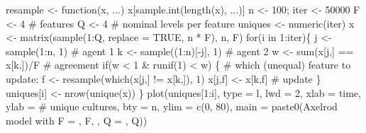 \documentclass[
  a4paper,
  DIV=11,
  numbers=noendperiod,
  oneside]{scrreprt}
\newenvironment{Shaded}{}{}
\newcommand{\AttributeTok}[1]{\textcolor[rgb]{0.84,0.23,0.29}{#1}}
\newcommand{\CommentTok}[1]{\textcolor[rgb]{0.42,0.45,0.49}{#1}}
\newcommand{\ConstantTok}[1]{\textcolor[rgb]{0.00,0.36,0.77}{#1}}
\newcommand{\ControlFlowTok}[1]{\textcolor[rgb]{0.84,0.23,0.29}{#1}}
\newcommand{\DecValTok}[1]{\textcolor[rgb]{0.00,0.36,0.77}{#1}}
\newcommand{\FunctionTok}[1]{\textcolor[rgb]{0.44,0.26,0.76}{#1}}
\newcommand{\NormalTok}[1]{\textcolor[rgb]{0.14,0.16,0.18}{#1}}
\newcommand{\OtherTok}[1]{\textcolor[rgb]{0.44,0.26,0.76}{#1}}
\newcommand{\SpecialCharTok}[1]{\textcolor[rgb]{0.00,0.36,0.77}{#1}}
\newcommand{\StringTok}[1]{\textcolor[rgb]{0.01,0.18,0.38}{#1}}
\begin{document}
\begin{Shaded}
\begin{Highlighting}[]
\NormalTok{resample }\OtherTok{\textless{}{-}} \ControlFlowTok{function}\NormalTok{(x, ...) x[}\FunctionTok{sample.int}\NormalTok{(}\FunctionTok{length}\NormalTok{(x), ...)]}
\NormalTok{n }\OtherTok{\textless{}{-}} \DecValTok{100}\NormalTok{; iter }\OtherTok{\textless{}{-}} \DecValTok{50000}
\NormalTok{F }\OtherTok{\textless{}{-}} \DecValTok{4} \CommentTok{\# features}
\NormalTok{Q }\OtherTok{\textless{}{-}} \DecValTok{4} \CommentTok{\# nominal levels per feature}
\NormalTok{uniques }\OtherTok{\textless{}{-}} \FunctionTok{numeric}\NormalTok{(iter)}
\NormalTok{x }\OtherTok{\textless{}{-}} \FunctionTok{matrix}\NormalTok{(}\FunctionTok{sample}\NormalTok{(}\DecValTok{1}\SpecialCharTok{:}\NormalTok{Q, }\AttributeTok{replace =} \ConstantTok{TRUE}\NormalTok{, n }\SpecialCharTok{*}\NormalTok{ F), n, F)}
\ControlFlowTok{for}\NormalTok{(i }\ControlFlowTok{in} \DecValTok{1}\SpecialCharTok{:}\NormalTok{iter)\{}
\NormalTok{  j }\OtherTok{\textless{}{-}} \FunctionTok{sample}\NormalTok{(}\DecValTok{1}\SpecialCharTok{:}\NormalTok{n, }\DecValTok{1}\NormalTok{)       }\CommentTok{\# agent 1}
\NormalTok{  k }\OtherTok{\textless{}{-}} \FunctionTok{sample}\NormalTok{((}\DecValTok{1}\SpecialCharTok{:}\NormalTok{n)[}\SpecialCharTok{{-}}\NormalTok{j], }\DecValTok{1}\NormalTok{) }\CommentTok{\# agent 2}
\NormalTok{  w }\OtherTok{\textless{}{-}} \FunctionTok{sum}\NormalTok{(x[j,] }\SpecialCharTok{==}\NormalTok{ x[k,])}\SpecialCharTok{/}\NormalTok{F }\CommentTok{\# agreement}
  \ControlFlowTok{if}\NormalTok{(w }\SpecialCharTok{\textless{}} \DecValTok{1} \SpecialCharTok{\&} \FunctionTok{runif}\NormalTok{(}\DecValTok{1}\NormalTok{) }\SpecialCharTok{\textless{}}\NormalTok{ w) \{}
    \CommentTok{\# which (unequal) feature to update:}
\NormalTok{    f }\OtherTok{\textless{}{-}} \FunctionTok{resample}\NormalTok{(}\FunctionTok{which}\NormalTok{(x[j,] }\SpecialCharTok{!=}\NormalTok{ x[k,]), }\DecValTok{1}\NormalTok{) }
\NormalTok{    x[j,f] }\OtherTok{\textless{}{-}}\NormalTok{ x[k,f] }\CommentTok{\# update}
\NormalTok{    \}}
\NormalTok{  uniques[i] }\OtherTok{\textless{}{-}} \FunctionTok{nrow}\NormalTok{(}\FunctionTok{unique}\NormalTok{(x))}
\NormalTok{\}}
\FunctionTok{plot}\NormalTok{(uniques[}\DecValTok{1}\SpecialCharTok{:}\NormalTok{i], }\AttributeTok{type =} \StringTok{\textquotesingle{}l\textquotesingle{}}\NormalTok{, }\AttributeTok{lwd =} \DecValTok{2}\NormalTok{, }\AttributeTok{xlab =} \StringTok{\textquotesingle{}time\textquotesingle{}}\NormalTok{,}
     \AttributeTok{ylab =} \StringTok{\textquotesingle{}\# unique cultures\textquotesingle{}}\NormalTok{, }\AttributeTok{bty =} \StringTok{\textquotesingle{}n\textquotesingle{}}\NormalTok{, }\AttributeTok{ylim =} \FunctionTok{c}\NormalTok{(}\DecValTok{0}\NormalTok{, }\DecValTok{80}\NormalTok{),}
     \AttributeTok{main =} \FunctionTok{paste0}\NormalTok{(}\StringTok{\textquotesingle{}Axelrod model with F = \textquotesingle{}}\NormalTok{, F, }\StringTok{\textquotesingle{}, Q = \textquotesingle{}}\NormalTok{, Q))}
\end{Highlighting}
\end{Shaded}
\end{document}
